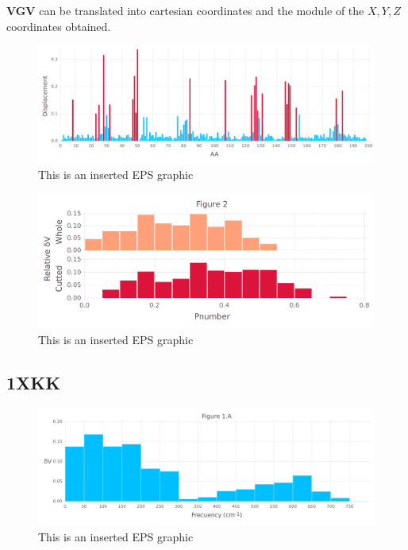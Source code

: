 \documentclass[10pt,letterpaper]{article}
\begin{document}
\FloatBarrier


\textbf{VGV} can be translated into cartesian coordinates and the module of the \(X, Y, Z\) coordinates obtained.

\begin{figure}[ht]
\begin{center}
\includegraphics[scale=0.5]{1hvr_hol/5figure.pdf}
\caption{This is an inserted EPS graphic}
\label{fig13}
\end{center}
\end{figure}

\begin{figure}[ht]
\begin{center}
\includegraphics[scale=0.5]{1hvr_hol/3both_figure.pdf}
\caption{This is an inserted EPS graphic}
\label{fig13}
\end{center}
\end{figure}

\FloatBarrier
\newpage

\subsection{1XKK}

\begin{figure}[ht]
\begin{center}
\includegraphics[scale=0.5]{1xkk/1afigure.pdf}
\caption{This is an inserted EPS graphic}
\label{fig1}
\end{center}
\end{figure}
\end{document}
